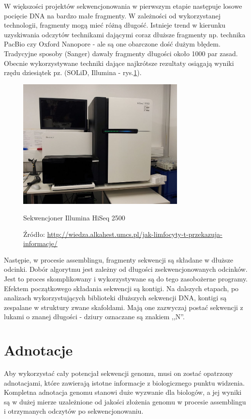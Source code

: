 W większości projektów sekwencjonowania w pierwszym etapie następuje losowe pocięcie DNA na bardzo małe fragmenty.
W zależności od wykorzystanej technologii, fragmenty mogą mieć różną długość.
Istnieje trend w kierunku uzyskiwania odczytów technikami dającymi coraz dłuższe fragmenty np. technika PacBio czy Oxford Nanopore - ale są one obarczone dość dużym błędem. 
Tradycyjne sposoby (Sanger) dawały fragmenty długości około 1000 par zasad. Obecnie wykorzystywane techniki dające najkrótsze rezultaty osiągają wyniki rzędu dziesiątek pz. (SOLiD, Illumina - rys.\ref{img:sekwencjoner-illumina}).

\begin{figure}[h]
	\centering
	\includegraphics[width=0.75\textwidth]{img/sekwencjoner-illumina.jpg}
	\caption{Sekwencjoner Illumina HiSeq 2500}
	\vspace{-0.5cm}
	\caption*{\scriptsize Źródło: \url{http://wiedza.alkahest.umcs.pl/jak-limfocyty-t-przekazuja-informacje/}}
	\label{img:sekwencjoner-illumina}
\end{figure}

Następie, w procesie assemblingu, fragmenty sekwencji są składane w dłuższe odcinki.
Dobór algorytmu jest zależny od długości zsekwencjonowanych odcinków.
Jest to proces skomplikowany i wykorzystywane są do tego zasobożerne programy. 
Efektem początkowego składania sekwencji są kontigi.
Na dalszych etapach, po analizach wykorzystujących biblioteki dłuższych sekwencji DNA, kontigi są zespalane w struktury zwane skafoldami.
Mają one zazwyczaj postać sekwencji z lukami o znanej długości - dziury oznaczane są znakiem ,,N''.

\section{Adnotacje}
Aby wykorzystać cały potencjał sekwencji genomu, musi on zostać opatrzony adnotacjami, które zawierają istotne informacje z biologicznego punktu widzenia.
Kompletna adnotacja genomu stanowi duże wyzwanie dla biologów, a jej wyniki są w dużej mierze uzależnione od jakości złożenia genomu w procesie assemblingu i otrzymanych odczytów po sekwencjonowaniu.

